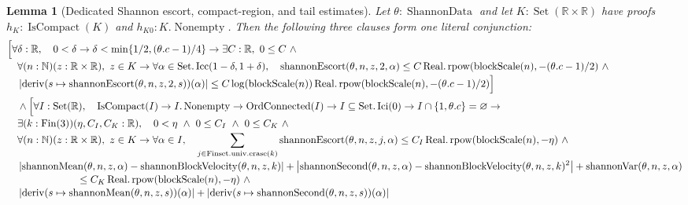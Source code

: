 \documentclass[9pt]{extarticle}
\newtheorem{lemma}{Lemma}[section]
\theoremstyle{definition}
\theoremstyle{remark}
\newcommand{\R}{\mathbb R}
\newcommand{\N}{\mathbb N}
\newcommand{\abs}[1]{\left\lvert #1\right\rvert}
\begin{document}
\begin{lemma}[Dedicated Shannon escort, compact-region, and tail estimates]
\label{lem:shannon-dedicated-escort}
Let $\theta:\operatorname{ShannonData}$ and let
$K:\operatorname{Set}(\R\times\R)$ have proofs
$h_K:\operatorname{IsCompact}(K)$ and
$h_{K0}:K.\operatorname{Nonempty}$.  Then the
following three clauses form one literal conjunction:
\begin{align*}
&\Bigl[\forall\delta:\R,\quad
 0<\delta\to
 \delta<\min\{1/2,(\theta.c-1)/4\}\to
 \exists C:\R,\ 0\leq C\ \wedge\\[-2pt]
&\quad\forall(n:\N)(z:\R\times\R),\ z\in K\to
 \forall\alpha\in\operatorname{Set.Icc}(1-\delta,1+\delta),\quad
 \operatorname{shannonEscort}(\theta,n,z,2,\alpha)
 \leq C\operatorname{Real.rpow}
  (\operatorname{blockScale}(n),-(\theta.c-1)/2)\ \wedge\\[-2pt]
&\quad
 \abs{\operatorname{deriv}
  (s\mapsto\operatorname{shannonEscort}(\theta,n,z,2,s))(\alpha)}
 \leq C\log(\operatorname{blockScale}(n))
  \operatorname{Real.rpow}
   (\operatorname{blockScale}(n),-(\theta.c-1)/2)
 \Bigr]\\
&\quad\wedge\Bigl[\forall I:\operatorname{Set}(\R),\quad
 \operatorname{IsCompact}(I)\to I.\operatorname{Nonempty}\to
 \operatorname{OrdConnected}(I)\to
 I\subseteq\operatorname{Set.Ici}(0)\to
 I\cap\{1,\theta.c\}=\varnothing\to\\[-2pt]
&\quad\exists(k:\operatorname{Fin}(3))(\eta,C_I,C_K:\R),\quad
 0<\eta\ \wedge\ 0\leq C_I\ \wedge\ 0\leq C_K\ \wedge\\[-2pt]
&\quad\forall(n:\N)(z:\R\times\R),\ z\in K\to\forall\alpha\in I,\quad
 \sum_{j\in\operatorname{Finset.univ.erase}(k)}
  \operatorname{shannonEscort}(\theta,n,z,j,\alpha)
 \leq C_I\operatorname{Real.rpow}(\operatorname{blockScale}(n),-\eta)\ 
 \wedge\\[-2pt]
&\quad
 \abs{\operatorname{shannonMean}(\theta,n,z,\alpha)
       -\operatorname{shannonBlockVelocity}(\theta,n,z,k)}
 +\abs{\operatorname{shannonSecond}(\theta,n,z,\alpha)
       -\operatorname{shannonBlockVelocity}(\theta,n,z,k)^2}
 +\operatorname{shannonVar}(\theta,n,z,\alpha)\\[-2pt]
&\hspace{24mm}\leq
 C_K\operatorname{Real.rpow}(\operatorname{blockScale}(n),-\eta)\ 
 \wedge\\[-2pt]
&\quad
 \abs{\operatorname{deriv}
  (s\mapsto\operatorname{shannonMean}(\theta,n,z,s))(\alpha)}
 +\abs{\operatorname{deriv}
  (s\mapsto\operatorname{shannonSecond}(\theta,n,z,s))(\alpha)}\\[-2pt]

\end{align*}
\end{lemma}
\end{document}
